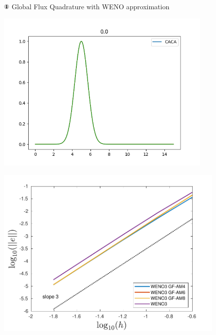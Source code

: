 \begin{frame}[t]{\includegraphics[width=0.3cm]{circle1} Global Flux Quadrature  with WENO approximation}
{	
	\begin{minipage}{0.5\textwidth}
		\centering\includegraphics[width=0.8\textwidth]{../figs/WENO-FD/figures/Burgers/MMS/initial} 
	\end{minipage}\hfill
	\begin{minipage}{0.5\textwidth}
		\centering\includegraphics[width=0.85\textwidth]{../figs/WENO-FD/figures/Burgers/MMS/weno3_AM_MMS_conv} 
	\end{minipage}
}

\end{frame}
